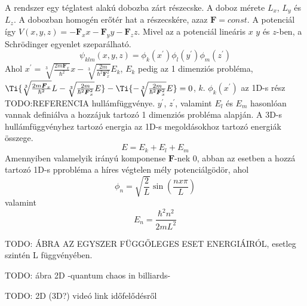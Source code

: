 A rendszer egy téglatest alakú dobozba zárt részecske. A doboz mérete $L_x$, $L_y$ és $L_z$. A dobozban homogén erőtér hat a részecskére, azaz $\boldsymbol{F} = const$. A potenciál így $V(x, y, z) = -\boldsymbol{F}_xx-\boldsymbol{F}_yy-\boldsymbol{F}_zz$. Mivel az a potenciál lineáris $x$ $y$ és $z$-ben, a Schrödinger egyenlet szeparálható.
    \begin{equation}
        \psi_{klm}\left(x, y, z\right) = \phi_k \left( x^\prime \right)\phi_l\left(y^\prime\right)\phi_m\left(z^\prime\right)
    \end{equation}
    Ahol $x^\prime = \sqrt[3]{\frac{2m\boldsymbol{F}_x}{\hbar^2}}x - \sqrt[3]{\frac{2m}{\hbar^2\boldsymbol{F}_x^2}}E_k$, $E_k$ pedig az 1 dimenziós probléma, $\Ti{\sqrt[3]{\frac{2m\boldsymbol{F}_x}{\hbar^2}}L - \sqrt[3]{\frac{2m}{\hbar^2\boldsymbol{F}_x^2}}E} - \Ti{-\sqrt[3]{\frac{2m}{\hbar^2\boldsymbol{F}_x^2}}E} = 0$, $k$. $\phi_k \left( x^\prime \right)$ az 1D-s rész TODO:REFERENCIA hullámfüggvénye. $y^\prime$, $z^\prime$, valamint $E_l$ és $E_m$ hasonlóan vannak definiálva a hozzájuk tartozó 1 dimenziós probléma alapján. A 3D-s hullámfüggvényhez tartozó energia az 1D-s megoldásokhoz tartozó energiák összege.
    \begin{equation}
        E = E_k + E_l + E_m
    \end{equation}
    Amennyiben valamelyik irányú komponense $\boldsymbol{F}$-nek 0, abban az esetben a hozzá tartozó 1D-s pprobléma a híres végtelen mély potenciálgödör, ahol
    \begin{equation}
        \phi_n = \sqrt{\frac{2}{L}}\sin\left(\frac{nx\pi}{L}\right)
    \end{equation}
    valamint
    \begin{equation}
        E_n = \frac{\hbar^2n^2}{2mL^2}
    \end{equation}
    
    TODO: ÁBRA AZ EGYSZER FÜGGŐLEGES ESET ENERGIÁIRÓL, esetleg szintén L függvényében.
    
    TODO: ábra 2D -quantum chaos in billiards-
    
    TODO: 2D (3D?) videó link időfelődésről
